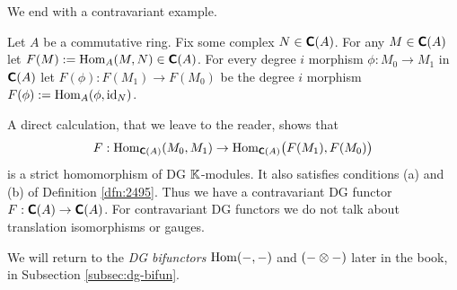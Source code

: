 We end with a contravariant example. 

\begin{exa} \label{exa:2300}
Let $A$ be a commutative ring. Fix some complex $N \in \boldsymbol{\mathsf{C}}(A)$. 
For any $M \in \boldsymbol{\mathsf{C}}(A)$ let 
$F(M) := \operatorname{Hom}_A(M, N) \in \boldsymbol{\mathsf{C}}(A)$.
For every degree $i$ morphism 
$\phi : M_0 \to M_1$ in $\boldsymbol{\mathsf{C}}(A)$ let
$F(\phi) : F(M_1) \to F(M_0)$ be the degree $i$ morphism
$F(\phi) := \operatorname{Hom}_A(\phi, \operatorname{id}_N)$.

A direct calculation, that we leave to the reader, shows that 
\[ F : \operatorname{Hom}_{\boldsymbol{\mathsf{C}}(A)}(M_0, M_1) \to 
\operatorname{Hom}_{\boldsymbol{\mathsf{C}}(A)} \bigl( F(M_1), F(M_0) \bigr) \]
is a strict homomorphism of DG $\mathbb{K}$-modules. It also satisfies conditions (a) 
and (b) of Definition \ref{dfn:2495}. Thus we have a contravariant DG 
functor 
$F : \boldsymbol{\mathsf{C}}(A) \to \boldsymbol{\mathsf{C}}(A)$.
For contravariant DG functors we do not talk about translation isomorphisms or 
gauges. 
\end{exa}

We will return to the {\em DG bifunctors} $\operatorname{Hom}(-, -)$ and 
$(- \otimes -)$ later in the book, in Subsection \ref{subsec:dg-bifun}.

